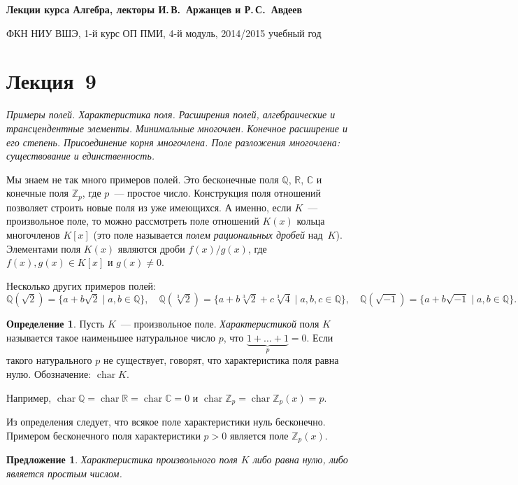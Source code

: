 \documentclass[a4paper,10pt]{amsart}
\newcommand{\xar}{\mathop{\mathrm{char}}}
\def\CC{{\mathbb C}}%
\def\ZZ{{\mathbb Z}}%
\def\RR{{\mathbb R}}%
\def\QQ{{\mathbb Q}}%
\newtheorem{proposition}{Предложение}
\theoremstyle{definition}
\newtheorem{definition}{Определение}
\theoremstyle{remark}
\begin{document}
%
\sloppy
%
\centerline{\large \bf Лекции курса \guillemotleft
Алгебра\guillemotright{}, лекторы И.\,В.~Аржанцев и Р.\,С.~Авдеев}

\smallskip

\centerline{\large ФКН НИУ ВШЭ, 1-й курс ОП ПМИ, 4-й модуль,
2014/2015 учебный год}


\bigskip

\section*{Лекция~9}

\medskip

{\it Примеры полей. Характеристика поля. Расширения полей,
алгебраические и трансцендентные элементы. Минимальные многочлен.
Конечное расширение и его степень. Присоединение корня многочлена.
Поле разложения многочлена: существование и единственность.}

\medskip

Мы знаем не так много примеров полей. Это бесконечные поля $\QQ$,
$\RR$, $\CC$ и конечные поля $\ZZ_p$, где $p$~--- простое число.
Конструкция поля отношений позволяет строить новые поля из уже
имеющихся. А именно, если $K$~--- произвольное поле, то можно
рассмотреть поле отношений $K(x)$ кольца многочленов $K[x]$ (это
поле называется \textit{полем рациональных дробей} над~$K$).
Элементами поля $K(x)$ являются дроби $f(x)/g(x)$, где $f(x), g(x)
\in K[x]$ и $g(x) \ne 0$.

Несколько других примеров полей:
$$
\QQ(\sqrt{2}) = \{a + b \sqrt{2} \mid a, b \in \QQ\}, \quad
\QQ(\sqrt[3]{2}) = \{a + b \sqrt[3]{2} + c\sqrt[3]{4} \mid a, b,
c\in\QQ\}, \quad \QQ(\sqrt{-1}) = \{a + b\sqrt{-1} \mid a, b \in \QQ
\}.
$$

\begin{definition}
Пусть $K$~--- произвольное поле. {\it Характеристикой} поля $K$
называется такое наименьшее натуральное число $p$, что
$\underbrace{1+\ldots+1}_p = 0$. Если такого натурального $p$ не
существует, говорят, что характеристика поля равна нулю.
Обозначение: $\xar K$.
\end{definition}

Например, $\xar \QQ = \xar \RR = \xar \CC = 0$ и $\xar \ZZ_p = \xar
\ZZ_p(x) = p$.

Из определения следует, что всякое поле характеристики нуль
бесконечно. Примером бесконечного поля характеристики $p > 0$
является поле $\ZZ_p(x)$.

\begin{proposition}
Характеристика произвольного поля $K$ либо равна нулю, либо является
простым числом.
\end{proposition}
\end{document}
